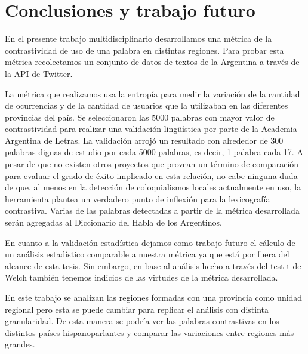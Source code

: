 \section{Conclusiones y trabajo futuro}
En el presente trabajo multidisciplinario desarrollamos una métrica de la contrastividad de uso de una palabra en distintas regiones. Para probar esta métrica recolectamos un conjunto de datos de textos de la Argentina a través de la API de Twitter.

La métrica que realizamos usa la entropía para medir la variación de la cantidad de ocurrencias y de la cantidad de usuarios que la utilizaban en las diferentes provincias del país. Se seleccionaron las 5000 palabras con mayor valor de contrastividad para realizar una validación lingüística por parte de la Academia Argentina de Letras. La validación arrojó un resultado con alrededor de 300 palabras dignas de estudio por cada 5000 palabras, es decir, 1 palabra cada 17. 
A pesar de que no existen otros proyectos que provean un término de comparación para evaluar el grado de éxito implicado en esta relación, no cabe ninguna duda de que, al menos en la detección de coloquialismos locales actualmente en uso, la herramienta plantea un verdadero punto de inflexión para la lexicografía contrastiva.
Varias de las palabras detectadas a partir de la métrica desarrollada serán agregadas al Diccionario del Habla de los Argentinos.

En cuanto a la validación estadística dejamos como trabajo futuro el cálculo de un análisis estadístico comparable a nuestra métrica ya que está por fuera del alcance de esta tesis. Sin embargo, en base al análisis hecho a través del test t de Welch también tenemos indicios de las virtudes de la métrica desarrollada. 

En este trabajo se analizan las regiones formadas con una provincia como unidad regional pero esta se puede cambiar para replicar el análisis con distinta granularidad. De esta manera se podría ver las palabras contrastivas en los distintos países hispanoparlantes y comparar las variaciones entre regiones más grandes.



